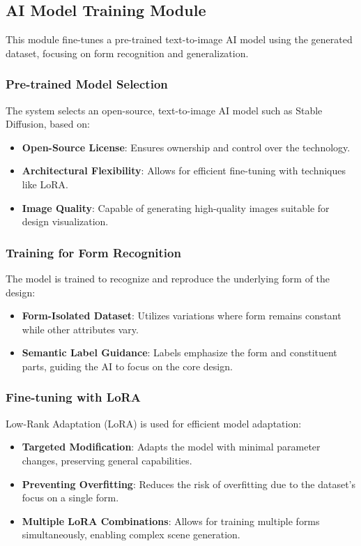 \documentclass{article}
\begin{document}
\subsection{AI Model Training Module}

This module fine-tunes a pre-trained text-to-image AI model using the generated dataset, focusing on form recognition and generalization.

\subsubsection{Pre-trained Model Selection}

The system selects an open-source, text-to-image AI model such as Stable Diffusion, based on:

\begin{itemize}
    \item \textbf{Open-Source License}: Ensures ownership and control over the technology.
    \item \textbf{Architectural Flexibility}: Allows for efficient fine-tuning with techniques like LoRA.
    \item \textbf{Image Quality}: Capable of generating high-quality images suitable for design visualization.
\end{itemize}

\subsubsection{Training for Form Recognition}

The model is trained to recognize and reproduce the underlying form of the design:

\begin{itemize}
    \item \textbf{Form-Isolated Dataset}: Utilizes variations where form remains constant while other attributes vary.
    \item \textbf{Semantic Label Guidance}: Labels emphasize the form and constituent parts, guiding the AI to focus on the core design.
\end{itemize}

\subsubsection{Fine-tuning with LoRA}

Low-Rank Adaptation (LoRA) is used for efficient model adaptation:

\begin{itemize}
    \item \textbf{Targeted Modification}: Adapts the model with minimal parameter changes, preserving general capabilities.
    \item \textbf{Preventing Overfitting}: Reduces the risk of overfitting due to the dataset's focus on a single form.
    \item \textbf{Multiple LoRA Combinations}: Allows for training multiple forms simultaneously, enabling complex scene generation.
\end{itemize}
\end{document}
